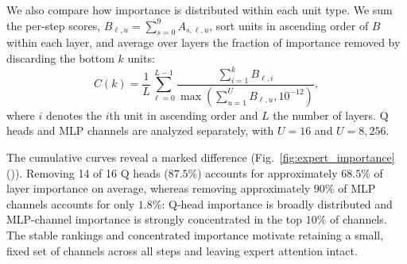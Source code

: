We also compare how importance is distributed within each unit type. We sum the per-step scores, $B_{\ell,u}=\sum_{s=0}^{9}A_{s,\ell,u}$, sort units in ascending order of $B$ within each layer, and average over layers the fraction of importance removed by discarding the bottom $k$ units:
\begin{equation}
    C(k)=\frac{1}{L}\sum_{\ell=0}^{L-1}
      \frac{\sum_{i=1}^{k}B_{\ell,i}}
           {\max\!\left(\sum_{u=1}^{U}B_{\ell,u},10^{-12}\right)},
    \label{eq:importance_concentration}
\end{equation}
where $i$ denotes the $i$th unit in ascending order and $L$ the number of layers. Q heads and MLP channels are analyzed separately, with $U=16$ and $U=8{,}256$.

The cumulative curves reveal a marked difference (Fig.~\ref{fig:expert_importance}()). Removing 14 of 16 Q heads ($87.5\%$) accounts for approximately $68.5\%$ of layer importance on average, whereas removing approximately $90\%$ of MLP channels accounts for only $1.8\%$: Q-head importance is broadly distributed and MLP-channel importance is strongly concentrated in the top $10\%$ of channels. The stable rankings and concentrated importance motivate retaining a small, fixed set of channels across all steps and leaving expert attention intact.
